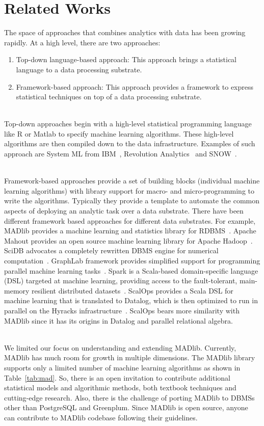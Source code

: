 \section{Related Works}
\label{sec:relwork}
The space of approaches that combines analytics with data has been growing rapidly. At a high level, there are two approaches:
\begin{enumerate}
\item Top-down language-based approach: This approach brings a statistical language to a data processing substrate.
\item Framework-based approach: This approach provides a framework to express statistical techniques on top of a data processing substrate. 
\end{enumerate}
  
~~\\
Top-down approaches begin with a high-level statistical programming language like R or Matlab to specify machine learning algorithms. These high-level algorithms are then compiled down to the data infrastructure. Examples of such approach are System ML from IBM~\cite{systemml11}, Revolution Analytics~\cite{rev} and SNOW~\cite{snow09}.

~~\\
Framework-based approaches provide a set of building blocks (individual machine learning algorithms) with library support for macro- and micro-programming to write the algorithms. Typically they provide a template to automate the common aspects of deploying an analytic task over a data substrate. There have been different framework based approaches for different data substrates. For example, MADlib provides a machine learning and statistics library for RDBMS~\cite{madlib12}. Apache Mahout provides an open source machine learning library for Apache Hadoop~\cite{mahout}. SciDB advocates a completely rewritten DBMS engine for numerical computation~\cite{scidb11}. GraphLab framework provides simplified support for programming parallel machine learning tasks~\cite{graph12}. Spark is a Scala-based domain-specific language (DSL) targeted at machine learning, providing access to the fault-tolerant, main-memory resilient distributed datasets~\cite{resi12}. ScalOps provides a Scala DSL for machine learning that is translated to Datalog, which is then optimized to run in parallel on the Hyracks infrastructure~\cite{hyracks11}. ScalOps bears more similarity with MADlib since it has its origins in Datalog and parallel relational algebra.

~~\\
We limited our focus on understanding and extending MADlib. Currently, MADlib has much room for growth in multiple dimensions. The MADlib library supports only a limited number of machine learning algorithms as shown in Table~\ref{tab:mad}. So, there is an open invitation to contribute additional statistical models and algorithmic methods, both textbook techniques and cutting-edge research. Also, there is the challenge of porting MADlib to DBMSs other than PostgreSQL and Greenplum. Since MADlib is open source, anyone can contribute to MADlib codebase following their guidelines. 
